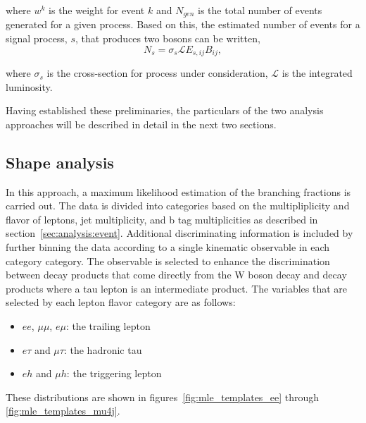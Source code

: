 \noindent
where $w^{k}$ is the weight for event $k$ and $N_{gen}$ is the total
number of events generated for a given process.  Based on this, the
estimated number of events for a signal process, $s$, that produces two
\PW bosons can be written,
\begin{equation}
\label{eq:data_model}
    N_{s} = \sigma_{s} \mathcal{L} E_{s,ij} B_{ij} ,
\end{equation}

\noindent
where $\sigma_{s}$ is the cross-section for process under consideration,
$\mathcal{L}$ is the integrated luminosity. 

Having established these preliminaries, the particulars of the two
analysis approaches will be described in detail in the next two
sections.



\FloatBarrier







\subsection{Shape analysis}
\label{sec:analysis:method:mle}

In this approach, a maximum likelihood estimation of the branching
fractions is carried out.  The data is divided into categories based on
the multipliplicity and flavor of leptons, jet multiplicity, and b tag
multiplicities as described in section~\ref{sec:analysis:event}.  Additional
discriminating information is included by further binning the data
according to a single kinematic observable in each category category.
The observable is selected to enhance the discrimination between decay
products that come directly from the W boson decay and decay products
where a tau lepton is an intermediate product.  The variables that are
selected by each lepton flavor category are as follows:

\begin{itemize}
    \item $ee$, $\mu\mu$, $e\mu$: the trailing lepton \pt
    \item $e\tau$ and $\mu\tau$: the hadronic tau \pt
    \item $eh$ and $\mu h$: the triggering lepton \pt
\end{itemize}

These distributions are shown in figures~\ref{fig:mle_templates_ee} through \ref{fig:mle_templates_mu4j}.


